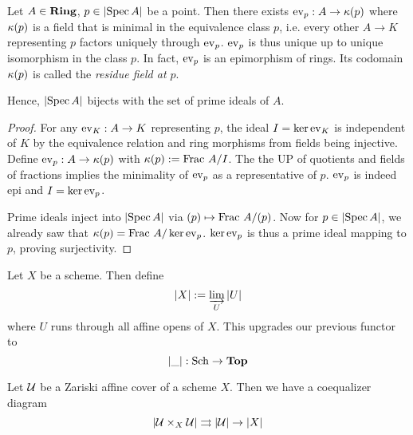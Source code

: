 \documentclass[./main.tex]{subfiles}
\begin{document}
\begin{lem}[Evaluation]
  
  Let $A \in \mathbf{Ring}$, $p \in \left\vert \operatorname{Spec} A \right\vert$ be a point.
  Then there exists $\operatorname{ev}_p : A \to \kappa(p)$
  where $\kappa(p)$ is a field that is minimal in 
  the equivalence class $p$,
  i.e. every other $A \to K$ representing $p$ 
  factors uniquely through $\operatorname{ev}_p$.
  $\operatorname{ev}_p$ is thus unique up to unique isomorphism in the class $p$.
  In fact, $\operatorname{ev}_p$ is an epimorphism of rings. 
  Its codomain $\kappa(p)$ is called the \emph{residue field at $p$}.

  Hence, 
  $\left\vert \operatorname{Spec} A \right\vert$ bijects with the set of prime ideals of $A$.
  
\end{lem}
\begin{proof}
  For any $\operatorname{ev}_K : A \to K$ representing $p$,
  the ideal $I = \ker\operatorname{ev}_K$ is independent of $K$ by 
  the equivalence relation and ring morphisms from fields being injective. 
  Define $\operatorname{ev}_p : A \to \kappa(p)$ with $\kappa(p) := \text{Frac }A/I$.
  The the UP of quotients and fields of fractions 
  implies the minimality of $\operatorname{ev}_p$ as a representative of $p$.
  $\operatorname{ev}_p$ is indeed epi and $I = \ker\operatorname{ev}_p$.

  Prime ideals inject into $\left\vert \operatorname{Spec} A \right\vert$ via 
  $\mathfrak{(}p) \mapsto \text{Frac }A/\mathfrak{(}p)$.
  Now for $p \in \left\vert \operatorname{Spec} A \right\vert$,
  we already saw that $\kappa(p) = \text{Frac }A/\ker\operatorname{ev}_p$.
  $\ker\operatorname{ev}_p$ is thus a prime ideal mapping to $p$, proving surjectivity. 
\end{proof}

\begin{dfn}
  
  Let $X$ be a scheme.
  Then define 
  \[
    \left\vert X \right\vert := \varinjlim_{U} \left\vert U \right\vert
  \]
  where $U$ runs through all affine opens of $X$.
  This upgrades our previous functor to
  \[
    \left\vert \_ \right\vert : \mathrm{Sch} \to \mathbf{Top}  
  \]
\end{dfn}

\begin{prop}
  
  Let $\mathcal{U}$ be a Zariski affine cover of a scheme $X$.
  Then we have a coequalizer diagram \[
      \left\vert \mathcal{U} \times_X \mathcal{U} \right\vert \rightrightarrows
      \left\vert \mathcal{U} \right\vert \to \left\vert X \right\vert
  \]
\end{prop}

  
\end{document}
